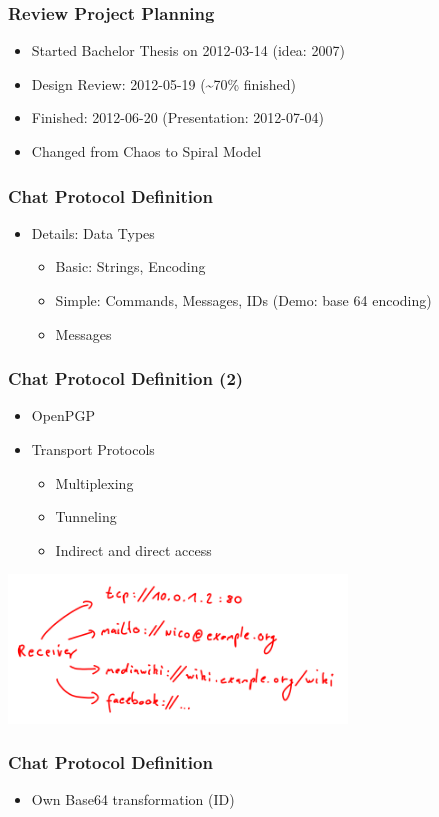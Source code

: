 \documentclass{beamer}
\begin{document}
\frame
{
    \frametitle{Review Project Planning}
    \begin{itemize}
    \item Started Bachelor Thesis on 2012-03-14 (idea: 2007)
    \item Design Review: 2012-05-19 (\textasciitilde{}70\% finished)
    \item Finished: 2012-06-20 (Presentation: 2012-07-04)
    \item Changed from Chaos to Spiral Model
    \end{itemize}
}


\frame
{
  \frametitle{Chat Protocol Definition}
  \begin{itemize}
      \item Details: Data Types 
      \begin{itemize}
          \item Basic: Strings, Encoding
          \item Simple: Commands, Messages, IDs \pause (Demo: base 64 encoding)
          \pause \item Messages
      \end{itemize}
   \end{itemize}
}

\frame
{
  \frametitle{Chat Protocol Definition (2)}
  \begin{itemize}
      \item OpenPGP
      \item Transport Protocols
      \begin{itemize}
          \item Multiplexing
          \item Tunneling
          \item Indirect and direct access
       \end{itemize}
   \end{itemize}
  \begin{center}
   \includegraphics[width=9cm]{../addressmultiplexing.png}
  \end{center}
}

\frame
{
  \frametitle{Chat Protocol Definition}
  \begin{itemize}
    \item Own Base64 transformation (ID)
   \end{itemize}
}
\end{document}
